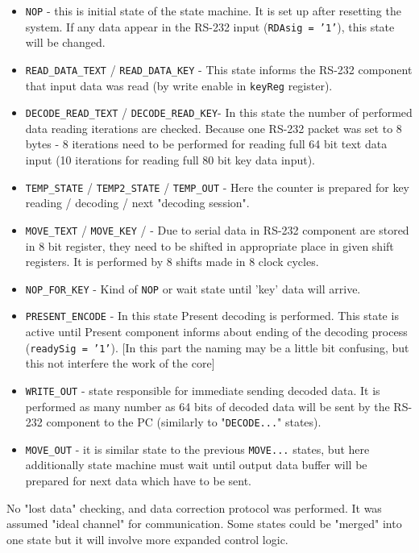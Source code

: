 \documentclass{gajewski}
\begin{document}
\begin{itemize}
    \item \texttt{NOP} - this is initial state of the state machine. It is set up after resetting the system. If any data appear in the RS-232 input (\texttt{RDAsig = '1'}), this state will be changed.
    \item \texttt{READ\_DATA\_TEXT} / \texttt{READ\_DATA\_KEY} - This state informs the RS-232 component that input data was read (by write enable in \texttt{keyReg} register). 
    \item \texttt{DECODE\_READ\_TEXT} / \texttt{DECODE\_READ\_KEY}- In this state the number of performed data reading iterations are checked. Because one RS-232 packet was set to 8 bytes - 8 iterations need to be performed for reading full 64 bit text data input (10 iterations for reading full 80 bit key data input).
    \item \texttt{TEMP\_STATE} / \texttt{TEMP2\_STATE} / \texttt{TEMP\_OUT} - Here the counter is prepared for key reading / decoding / next "decoding session".
    \item \texttt{MOVE\_TEXT} / \texttt{MOVE\_KEY} / - Due to serial data in RS-232 component are stored in 8 bit register, they need to be shifted in appropriate place in given shift registers. It is performed by 8 shifts made in 8 clock cycles.
    \item \texttt{NOP\_FOR\_KEY} - Kind of \texttt{NOP} or wait state until 'key' data will arrive.
    \item \texttt{PRESENT\_ENCODE} - In this state Present decoding is performed. This state is active until Present component informs about ending of the decoding process (\texttt{readySig = '1'}). [In this part the naming may be a little bit confusing, but this not interfere the work of the core]
    \item \texttt{WRITE\_OUT} - state responsible for immediate sending decoded data. It is performed as many number as 64 bits of decoded data will be sent by the RS-232 component to the PC (similarly to "\texttt{DECODE...}" states). 
    \item \texttt{MOVE\_OUT} - it is similar state to the previous \texttt{MOVE...} states, but here additionally state machine must wait until output data buffer will be prepared for next data which have to be sent.
\end{itemize}
No "lost data" checking, and data correction protocol was performed. It was assumed "ideal channel" for communication. Some states could be "merged" into one state but it will involve more expanded control logic.
\end{document}
